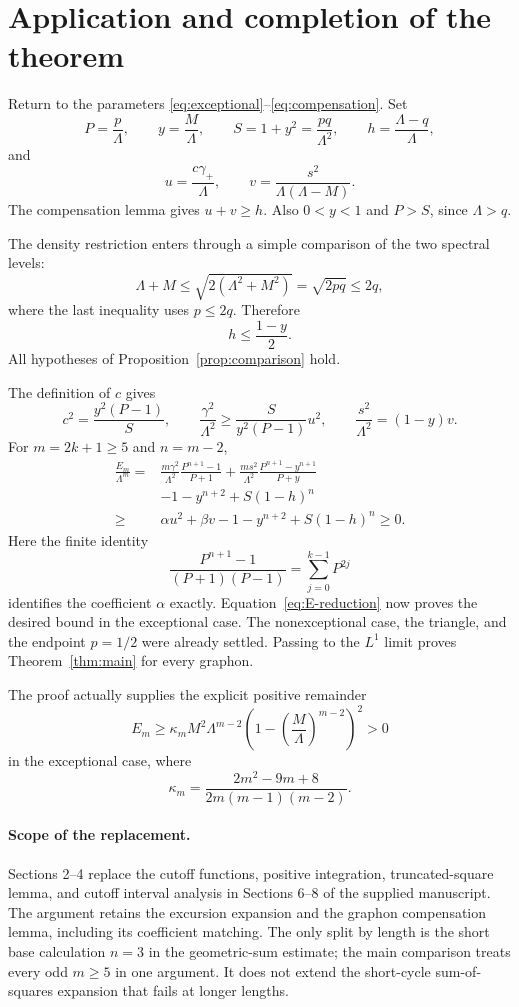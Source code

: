 \documentclass[11pt]{article}
\theoremstyle{remark}
\begin{document}
\section{Application and completion of the theorem}

Return to the parameters \eqref{eq:exceptional}--\eqref{eq:compensation}. Set
\[
 P=\frac p\Lambda,\qquad y=\frac M\Lambda,\qquad
 S=1+y^2=\frac{pq}{\Lambda^2},\qquad
 h=\frac{\Lambda-q}{\Lambda},
\]
and
\[
 u=\frac{c\gamma_+}{\Lambda},\qquad
 v=\frac{s^2}{\Lambda(\Lambda-M)}.
\]
The compensation lemma gives $u+v\ge h$. Also $0<y<1$ and $P>S$, since $\Lambda>q$.

The density restriction enters through a simple comparison of the two spectral levels:
\[
 \Lambda+M\le\sqrt{2(\Lambda^2+M^2)}
 =\sqrt{2pq}\le2q,
\]
where the last inequality uses $p\le2q$. Therefore
\[
 h\le\frac{1-y}{2}.
\]
All hypotheses of Proposition~\ref{prop:comparison} hold.

The definition of $c$ gives
\[
 c^2=\frac{y^2(P-1)}S,
 \qquad
 \frac{\gamma^2}{\Lambda^2}\ge\frac{S}{y^2(P-1)}u^2,
 \qquad
 \frac{s^2}{\Lambda^2}=(1-y)v.
\]
For $m=2k+1\ge5$ and $n=m-2$,
\begin{align*}
 \frac{E_m}{\Lambda^m}
 ={}&\frac{m\gamma^2}{\Lambda^2}
          \frac{P^{n+1}-1}{P+1}
      +\frac{ms^2}{\Lambda^2}
          \frac{P^{n+1}-y^{n+1}}{P+y}\\
    &-1-y^{n+2}+S(1-h)^n\\
 \ge{}&\alpha u^2+\beta v-1-y^{n+2}+S(1-h)^n\ge0.
\end{align*}
Here the finite identity
\[
 \frac{P^{n+1}-1}{(P+1)(P-1)}
 =\sum_{j=0}^{k-1}P^{2j}
\]
identifies the coefficient $\alpha$ exactly. Equation~\eqref{eq:E-reduction} now proves the desired bound in the exceptional case. The nonexceptional case, the triangle, and the endpoint $p=1/2$ were already settled. Passing to the $L^1$ limit proves Theorem~\ref{thm:main} for every graphon.

The proof actually supplies the explicit positive remainder
\[
 E_m\ge\kappa_m M^2\Lambda^{m-2}
       \left(1-\left(\frac M\Lambda\right)^{m-2}\right)^2>0
\]
in the exceptional case, where
\[
 \kappa_m=\frac{2m^2-9m+8}{2m(m-1)(m-2)}.
\]

\paragraph{Scope of the replacement.}
Sections 2--4 replace the cutoff functions, positive integration, truncated-square lemma, and cutoff interval analysis in Sections 6--8 of the supplied manuscript. The argument retains the excursion expansion and the graphon compensation lemma, including its coefficient matching. The only split by length is the short base calculation $n=3$ in the geometric-sum estimate; the main comparison treats every odd $m\ge5$ in one argument. It does not extend the short-cycle sum-of-squares expansion that fails at longer lengths.
\end{document}
